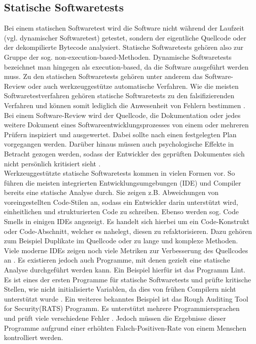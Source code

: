 \documentclass[a4paper]{book}
\begin{document}
\begin{large}
\subsection{Statische Softwaretests}
\label{Softwaretests}
\begin{onehalfspace}
Bei einem statischen Softwaretest wird die Software nicht während der Laufzeit (vgl. dynamischer Softwaretest) getestet, sondern der eigentliche Quellcode oder der dekompilierte Bytecode analysiert. Statische Softwaretests gehören also zur Gruppe der sog. \glqq non-execution-based\grqq -Methoden. Dynamische Softwaretests bezeichnet man hingegen als \glqq execution-based\grqq , da die Software ausgeführt werden muss. Zu den statischen Softwaretests gehören unter anderem das Software-Review oder auch werkzeuggestütze automatische Verfahren. Wie die meisten Softwaretestverfahren gehören statische Softwaretests zu den falsifizierenden Verfahren und können somit lediglich die Anwesenheit von Fehlern bestimmen \cite{Spillner.2019, Myers.2012}. \\ \indent
Bei einem Software-Review wird der Quellcode, die Dokumentation oder jedes weitere Dokument eines Softwareentwicklungsprozesses von einem oder mehreren Prüfern inspiziert und ausgewertet. Dabei sollte nach einen festgelegten Plan vorgegangen werden. Darüber hinaus müssen auch psychologische Effekte in Betracht gezogen werden, sodass der Entwickler des geprüften Dokumentes sich nicht persönlich kritisiert sieht \cite{Spillner.2019}. \\ \indent
Werkzeuggestützte statische Softwaretests kommen in vielen Formen vor. So führen die meisten integrierten Entwicklungsumgebungen (IDE) und Compiler bereits eine statische Analyse durch. Sie zeigen z.B. Abweichungen von voreingestellten Code-Stilen an, sodass ein Entwickler darin unterstützt wird, einheitlichen und strukturierten Code zu schreiben. Ebenso werden sog. \glqq Code Smells\grqq{} in einigen IDEs angezeigt. Es handelt sich hierbei um ein Code-Konstrukt oder Code-Abschnitt, welcher es nahelegt, diesen zu refaktorisieren. Dazu gehören zum Beispiel Duplikate im Quellcode oder zu lange und komplexe Methoden. Viele moderne IDEs zeigen noch viele Metriken zur Verbesserung des Quellcodes an \cite{Spillner.2019, Mili.2015}. Es existieren jedoch auch Programme, mit denen gezielt eine statische Analyse durchgeführt werden kann. Ein Beispiel hierfür ist das Programm \glqq Lint\grqq . Es ist eines der ersten Programme für statische Softwaretests und prüfte kritische Stellen, wie nicht initialisierte Variablen, da dies von frühen Compilern nicht unterstützt wurde \cite{Johnson1978LintAC}. Ein weiteres bekanntes Beispiel ist das \glqq Rough Auditing Tool for Security\grqq{}(RATS) Programm. Es unterstützt mehrere Programmiersprachen und prüft viele verschiedene Fehler \cite{SecureSoftwareInc..2013}. Jedoch müssen die Ergebnisse dieser Programme aufgrund einer erhöhten Falsch-Positiven-Rate von einem Menschen kontrolliert werden.
\end{onehalfspace}




\end{large}
\end{document}
